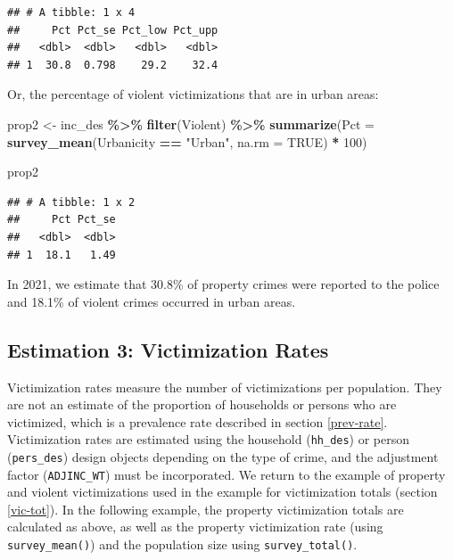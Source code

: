 \documentclass[
]{krantz}
\makeatletter
\newenvironment{Shaded}{\begin{snugshade}}{\end{snugshade}}
\newcommand{\AttributeTok}[1]{\textcolor[rgb]{0.27,0.27,0.27}{#1}}
\newcommand{\ConstantTok}[1]{\textcolor[rgb]{0.37,0.37,0.37}{#1}}
\newcommand{\DecValTok}[1]{\textcolor[rgb]{0.06,0.06,0.06}{#1}}
\newcommand{\FunctionTok}[1]{\textcolor[rgb]{0.27,0.27,0.27}{\textbf{#1}}}
\newcommand{\NormalTok}[1]{#1}
\newcommand{\OtherTok}[1]{\textcolor[rgb]{0.37,0.37,0.37}{#1}}
\newcommand{\SpecialCharTok}[1]{\textcolor[rgb]{0.43,0.43,0.43}{\textbf{#1}}}
\newcommand{\StringTok}[1]{\textcolor[rgb]{0.5,0.5,0.5}{#1}}
\newenvironment{kframe}{%
\medskip{}
\setlength{\fboxsep}{.8em}
 \def\at@end@of@kframe{}%
 \ifinner\ifhmode%
  \def\at@end@of@kframe{\end{minipage}}%
  \begin{minipage}{\columnwidth}%
 \fi\fi%
 \def\FrameCommand##1{\hskip\@totalleftmargin \hskip-\fboxsep
 \colorbox{shadecolor}{##1}\hskip-\fboxsep
     \hskip-\linewidth \hskip-\@totalleftmargin \hskip\columnwidth}%
 \MakeFramed {\advance\hsize-\width
   \@totalleftmargin\z@ \linewidth\hsize
   \@setminipage}}%
 {\par\unskip\endMakeFramed%
 \at@end@of@kframe}
\renewenvironment{Shaded}{\begin{kframe}}{\end{kframe}}
\makeatother
\begin{document}
\begin{verbatim}
## # A tibble: 1 x 4
##     Pct Pct_se Pct_low Pct_upp
##   <dbl>  <dbl>   <dbl>   <dbl>
## 1  30.8  0.798    29.2    32.4
\end{verbatim}

Or, the percentage of violent victimizations that are in urban areas:

\begin{Shaded}
\begin{Highlighting}[]
\NormalTok{prop2 }\OtherTok{\textless{}{-}}\NormalTok{ inc\_des }\SpecialCharTok{\%\textgreater{}\%}
  \FunctionTok{filter}\NormalTok{(Violent) }\SpecialCharTok{\%\textgreater{}\%}
  \FunctionTok{summarize}\NormalTok{(}\AttributeTok{Pct =} \FunctionTok{survey\_mean}\NormalTok{(Urbanicity }\SpecialCharTok{==} \StringTok{"Urban"}\NormalTok{, }\AttributeTok{na.rm =} \ConstantTok{TRUE}\NormalTok{) }\SpecialCharTok{*} \DecValTok{100}\NormalTok{)}

\NormalTok{prop2}
\end{Highlighting}
\end{Shaded}

\begin{verbatim}
## # A tibble: 1 x 2
##     Pct Pct_se
##   <dbl>  <dbl>
## 1  18.1   1.49
\end{verbatim}

In 2021, we estimate that 30.8\% of property crimes were reported to the police and 18.1\% of violent crimes occurred in urban areas.

\hypertarget{vic-rate}{%
\subsection{Estimation 3: Victimization Rates}\label{vic-rate}}

Victimization rates measure the number of victimizations per population. They are not an estimate of the proportion of households or persons who are victimized, which is a prevalence rate described in section \ref{prev-rate}. Victimization rates are estimated using the household (\texttt{hh\_des}) or person (\texttt{pers\_des}) design objects depending on the type of crime, and the adjustment factor (\texttt{ADJINC\_WT}) must be incorporated. We return to the example of property and violent victimizations used in the example for victimization totals (section \ref{vic-tot}). In the following example, the property victimization totals are calculated as above, as well as the property victimization rate (using \texttt{survey\_mean()}) and the population size using \texttt{survey\_total()}.
\end{document}
